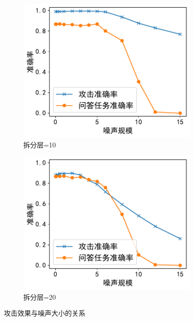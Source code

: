 \begin{figure}[h!]
    \centering
    \begin{subfigure}{0.48\linewidth}
    \includegraphics[width=\linewidth]{Z_Resources/perm-llm_squad-noise-layer10.pdf}
    \caption{拆分层=10}
    \end{subfigure}
    \begin{subfigure}{0.48\linewidth}    
    \includegraphics[width=\linewidth]{Z_Resources/perm-llm_squad-noise-layer20.pdf}
    \caption{拆分层=20}    
    \end{subfigure}
    \caption{攻击效果与噪声大小的关系}
    \label{fig:perm-llm:attack-noise}
\end{figure}

